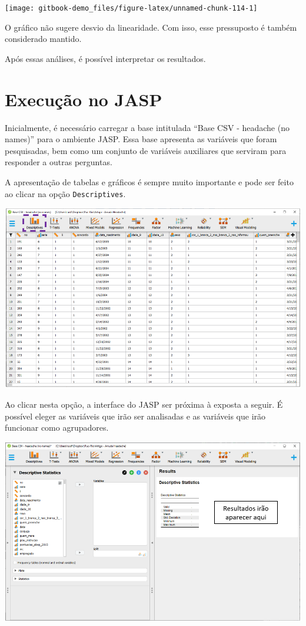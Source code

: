 \documentclass[
]{book}
\begin{document}
\begin{center}\texttt{[image: gitbook-demo\_files/figure-latex/unnamed-chunk-114-1]} \end{center}

O gráfico não sugere desvio da linearidade. Com isso, esse pressuposto é também considerado mantido.

Após essas análises, é possível interpretar os resultados.

\hypertarget{execuuxe7uxe3o-no-jasp-8}{%
\section{Execução no JASP}\label{execuuxe7uxe3o-no-jasp-8}}

Inicialmente, é necessário carregar a base intitulada ``Base CSV - headache (no names)'' para o ambiente JASP. Essa base apresenta as variáveis que foram pesquisadas, bem como um conjunto de variáveis auxiliares que serviram para responder a outras perguntas.

A apresentação de tabelas e gráficos é sempre muito importante e pode ser feito ao clicar na opção \texttt{Descriptives}.

\includegraphics{./img/cap_logistica_base.png}

Ao clicar nesta opção, a interface do JASP ser próxima à exposta a seguir. É possível eleger as variáveis que irão ser analisadas e as variáveis que irão funcionar como agrupadores.

\includegraphics{./img/cap_logistica_descriptives.png}
\end{document}
